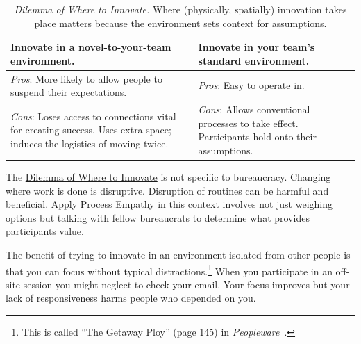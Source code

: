 \begin{center}
\begin{table}[H] %
\begin{tabular}{ | m{\dilemmatablewidth}| m{\dilemmatablewidth} | } 
  \hline
  \textbf{Innovate in a novel-to-your-team environment.} &
  \textbf{Innovate in your team's standard environment.} \\
  \hline
  \textit{Pros}: More likely to allow people to suspend their expectations.  & 
  \textit{Pros}: Easy to operate in. \\
  \hline
  \textit{Cons}: Loses access to connections vital for creating success. Uses extra space; induces the logistics of moving twice. & 
  \textit{Cons}: Allows conventional processes to take effect. Participants hold onto their assumptions. \\
  \hline
\end{tabular}
\caption{
\textit{Dilemma of Where to Innovate.}
Where (physically, spatially) innovation takes place matters because the environment sets context for assumptions.
}
\label{table:dilemma-personal-where-to-innovate}
\end{table}
\end{center}

The \hyperref[table:dilemma-personal-where-to-innovate]{Dilemma of Where to Innovate} 
\iftoggle{printedonpaper}{ (\ref{table:dilemma-personal-where-to-innovate})}{}%
is not specific to bureaucracy. Changing where work is done is disruptive. Disruption of routines can be harmful and beneficial. Apply Process Empathy in this context involves not just weighing options but talking with fellow bureaucrats to determine what provides participants value. 

The benefit of trying to innovate in an
environment isolated from other people is that you can focus without typical distractions.\footnote{This is called ``The Getaway Ploy'' (page 145) in \textit{Peopleware}~\cite{1987_DeMarco}.} When you participate in an off-site session you might neglect to check your email. Your focus improves but your lack of responsiveness harms people who depended on you.

